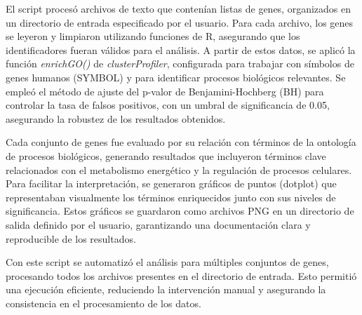 El script procesó archivos de texto que contenían listas de genes, organizados en un directorio de entrada especificado por el usuario. Para cada archivo, los genes se leyeron y limpiaron utilizando funciones de R, asegurando que los identificadores fueran válidos para el análisis. A partir de estos datos, se aplicó la función \textit{enrichGO()} de \textit{clusterProfiler}, configurada para trabajar con símbolos de genes humanos (SYMBOL) y para identificar procesos biológicos relevantes. Se empleó el método de ajuste del p-valor de Benjamini-Hochberg (BH) para controlar la tasa de falsos positivos, con un umbral de significancia de 0.05, asegurando la robustez de los resultados obtenidos.

Cada conjunto de genes fue evaluado por su relación con términos de la ontología de procesos biológicos, generando resultados que incluyeron términos clave relacionados con el metabolismo energético y la regulación de procesos celulares. Para facilitar la interpretación, se generaron gráficos de puntos (dotplot) que representaban visualmente los términos enriquecidos junto con sus niveles de significancia. Estos gráficos se guardaron como archivos PNG en un directorio de salida definido por el usuario, garantizando una documentación clara y reproducible de los resultados.

Con este script se automatizó el análisis para múltiples conjuntos de genes, procesando todos los archivos presentes en el directorio de entrada. Esto permitió una ejecución eficiente, reduciendo la intervención manual y asegurando la consistencia en el procesamiento de los datos.




